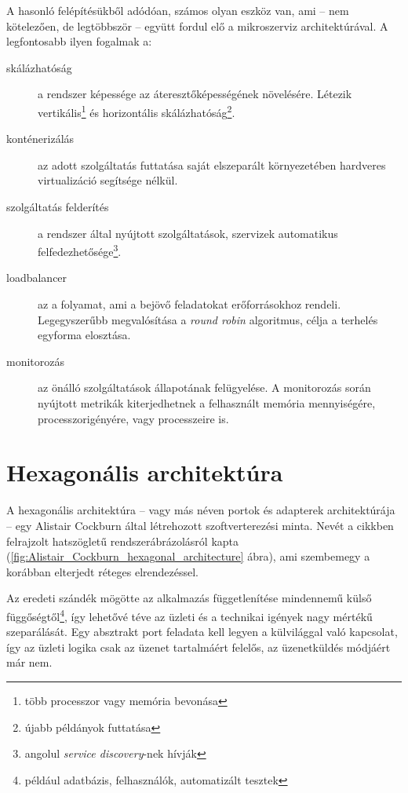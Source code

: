 A hasonló felépítésükből adódóan, számos olyan eszköz van, ami --  nem kötelezően, de legtöbbször --   együtt fordul elő a mikroszerviz architektúrával. A legfontosabb ilyen fogalmak a:
\begin{description}
	\item[skálázhatóság] a rendszer képessége az áteresztőképességének növelésére.
	Létezik vertikális\footnote{több processzor vagy memória bevonása} és horizontális skálázhatóság\footnote{újabb példányok futtatása}.
	
	\item[konténerizálás] az adott szolgáltatás futtatása saját elszeparált környezetében hardveres virtualizáció segítsége nélkül.	

	\item[szolgáltatás felderítés] a rendszer által nyújtott szolgáltatások, szervizek automatikus
	felfedezhetősége\footnote{angolul \textit{service discovery}-nek hívják}.
	
	\item[loadbalancer] az a folyamat, ami a bejövő feladatokat erőforrásokhoz rendeli. Legegyszerűbb megvalósítása a \foreignlanguage{british}{\textit{round robin}} algoritmus, célja a terhelés egyforma elosztása.
	
	\item[monitorozás] az önálló szolgáltatások állapotának felügyelése. A monitorozás során nyújtott metrikák kiterjedhetnek a felhasznált memória mennyiségére, processzorigényére, vagy processzeire is.
\end{description}


\section{Hexagonális architektúra}\label{sec:hexagonalis_architektura}
A hexagonális architektúra --  vagy más néven portok és adapterek architektúrája --   egy \foreignlanguage{british}{Alistair Cockburn} által létrehozott \cite{Alistair_Cockburn} szoftverterezési minta. Nevét a cikkben felrajzolt hatszögletű rendszerábrázolásról kapta (\ref{fig:Alistair_Cockburn_hexagonal_architecture} ábra), ami szembemegy a korábban elterjedt réteges elrendezéssel.

Az eredeti szándék mögötte az alkalmazás függetlenítése mindennemű külső függőségtől\footnote{például adatbázis, felhasználók, automatizált tesztek}, így lehetővé téve az üzleti és a technikai igények nagy mértékű szeparálását.
Egy absztrakt port feladata kell legyen a külvilággal való kapcsolat, így az üzleti logika csak az üzenet tartalmáért felelős, az üzenetküldés módjáért már nem.

